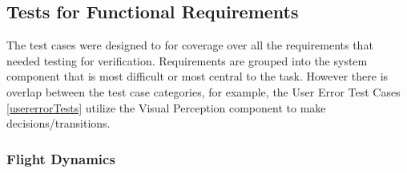 \documentclass[12pt, titlepage]{article}
\begin{document}
\subsection{Tests for Functional Requirements}

The test cases were designed to for coverage over all the requirements that needed testing for verification. Requirements are grouped into the system component that is most difficult or most central to the task. However there is overlap between the test case categories, for example, the User Error Test Cases \ref{usererrorTests} utilize the Visual Perception component to make decisions/transitions.

\subsubsection{Flight Dynamics}
\label{flightdynamicsTests}
\end{document}
